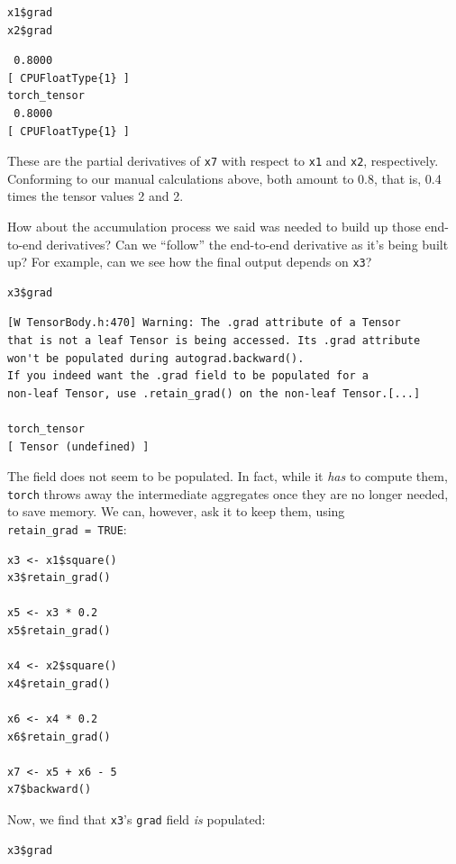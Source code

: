 \documentclass[
  letterpaper,
]{krantz}
\begin{document}
\begin{verbatim}
x1$grad
x2$grad
\end{verbatim}

\begin{verbatim}
 0.8000
[ CPUFloatType{1} ]
torch_tensor
 0.8000
[ CPUFloatType{1} ]
\end{verbatim}

These are the partial derivatives of \texttt{x7} with respect to
\texttt{x1} and \texttt{x2}, respectively. Conforming to our manual
calculations above, both amount to 0.8, that is, 0.4 times the tensor
values 2 and 2.

How about the accumulation process we said was needed to build up those
end-to-end derivatives? Can we ``follow'' the end-to-end derivative as
it's being built up? For example, can we see how the final output
depends on \texttt{x3}?

\begin{verbatim}
x3$grad
\end{verbatim}

\begin{verbatim}
[W TensorBody.h:470] Warning: The .grad attribute of a Tensor
that is not a leaf Tensor is being accessed. Its .grad attribute
won't be populated during autograd.backward().
If you indeed want the .grad field to be populated for a 
non-leaf Tensor, use .retain_grad() on the non-leaf Tensor.[...]

torch_tensor
[ Tensor (undefined) ]
\end{verbatim}

The field does not seem to be populated. In fact, while it \emph{has} to
compute them, \texttt{torch} throws away the intermediate aggregates
once they are no longer needed, to save memory. We can, however, ask it
to keep them, using \texttt{retain\_grad\ =\ TRUE}:

\begin{verbatim}
x3 <- x1$square()
x3$retain_grad()

x5 <- x3 * 0.2
x5$retain_grad()

x4 <- x2$square()
x4$retain_grad()

x6 <- x4 * 0.2
x6$retain_grad()

x7 <- x5 + x6 - 5
x7$backward()
\end{verbatim}

Now, we find that \texttt{x3}'s \texttt{grad} field \emph{is} populated:

\begin{verbatim}
x3$grad
\end{verbatim}
\end{document}
